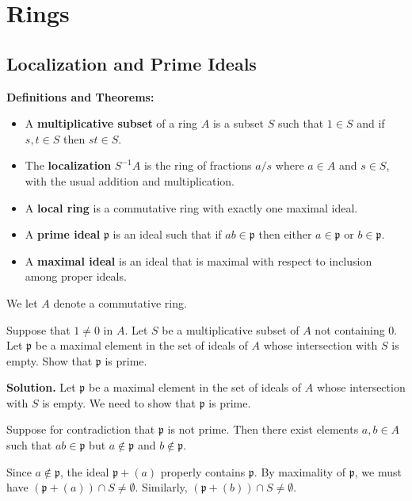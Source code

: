 \chapter{Rings}

\section{Localization and Prime Ideals}

\noindent\textbf{Definitions and Theorems:}
\begin{itemize}
\item A \textbf{multiplicative subset} of a ring $A$ is a subset $S$ such that $1 \in S$ and if $s, t \in S$ then $st \in S$.
\item The \textbf{localization} $S^{-1}A$ is the ring of fractions $a/s$ where $a \in A$ and $s \in S$, with the usual addition and multiplication.
\item A \textbf{local ring} is a commutative ring with exactly one maximal ideal.
\item A \textbf{prime ideal} $\mathfrak{p}$ is an ideal such that if $ab \in \mathfrak{p}$ then either $a \in \mathfrak{p}$ or $b \in \mathfrak{p}$.
\item A \textbf{maximal ideal} is an ideal that is maximal with respect to inclusion among proper ideals.
\end{itemize}

We let $A$ denote a commutative ring.

\begin{problembox}
Suppose that $1 \neq 0$ in $A$. Let $S$ be a multiplicative subset of $A$ not containing $0$. Let $\mathfrak{p}$ be a maximal element in the set of ideals of $A$ whose intersection with $S$ is empty. Show that $\mathfrak{p}$ is prime.
\end{problembox}

\noindent\textbf{Solution.}
Let $\mathfrak{p}$ be a maximal element in the set of ideals of $A$ whose intersection with $S$ is empty. We need to show that $\mathfrak{p}$ is prime.

Suppose for contradiction that $\mathfrak{p}$ is not prime. Then there exist elements $a, b \in A$ such that $ab \in \mathfrak{p}$ but $a \notin \mathfrak{p}$ and $b \notin \mathfrak{p}$.

Since $a \notin \mathfrak{p}$, the ideal $\mathfrak{p} + (a)$ properly contains $\mathfrak{p}$. By maximality of $\mathfrak{p}$, we must have $(\mathfrak{p} + (a)) \cap S \neq \emptyset$. Similarly, $(\mathfrak{p} + (b)) \cap S \neq \emptyset$.

